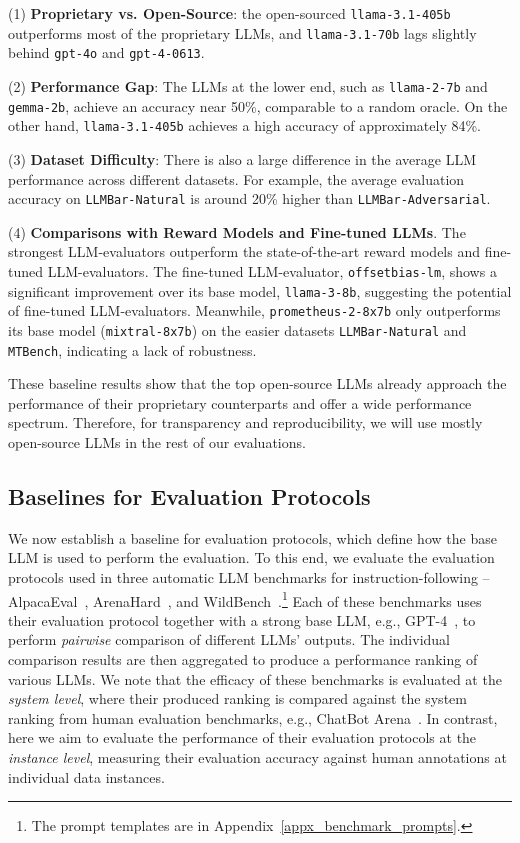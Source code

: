 \documentclass[11pt]{article}
\newcommand{\llmbarnatural}{\texttt{LLMBar-Natural}\xspace}
\newcommand{\adversarial}{\texttt{LLMBar-Adversarial}\xspace}
\newcommand{\mtbench}{\texttt{MTBench}\xspace}
\begin{document}
\noindent (1) \textbf{Proprietary vs. Open-Source}: the open-sourced \texttt{llama-3.1-405b} outperforms most of the proprietary LLMs, and \texttt{llama-3.1-70b}  lags slightly behind \texttt{gpt-4o} and \texttt{gpt-4-0613}.

% 

\noindent (2) \textbf{Performance Gap}:
The LLMs at the lower end, such as \texttt{llama-2-7b} and \texttt{gemma-2b}, achieve an accuracy near 50\%, comparable to a random oracle.
On the other hand, \texttt{llama-3.1-405b} achieves a high accuracy of approximately 84\%.

\noindent (3) \textbf{Dataset Difficulty}: 
There is also a large difference in the average LLM performance across different datasets.
For example, the average evaluation accuracy on \llmbarnatural is around 20\% higher than \adversarial.
% 

\noindent (4) \textbf{Comparisons with Reward Models and Fine-tuned LLMs}. 
The strongest LLM-evaluators outperform the state-of-the-art reward models and fine-tuned LLM-evaluators.
The fine-tuned LLM-evaluator, \texttt{offsetbias-lm}, shows a significant improvement over its base model, \texttt{llama-3-8b}, suggesting the potential of fine-tuned LLM-evaluators.
Meanwhile, \texttt{prometheus-2-8x7b} only outperforms its base model (\texttt{mixtral-8x7b}) on the easier datasets \llmbarnatural and \mtbench, indicating a lack of robustness.


These baseline results show that the top open-source LLMs already approach the performance of their proprietary counterparts and offer a wide performance spectrum. 
Therefore, for transparency and reproducibility, we will use mostly open-source LLMs in the rest of our evaluations.

\subsection{Baselines for Evaluation Protocols}
\label{baselines_protocols}




We now establish a baseline for evaluation protocols, which define how the base LLM is used to perform the evaluation.
To this end, we evaluate the evaluation protocols used in three automatic LLM benchmarks for instruction-following -- AlpacaEval~\cite{alpaca_eval}, ArenaHard~\cite{li2024crowdsourced}, and WildBench~\cite{lin2024wildbench}.\footnote{The prompt templates are in Appendix~\ref{appx_benchmark_prompts}.}
Each of these benchmarks uses their evaluation protocol together with a strong base LLM, e.g., GPT-4~\citep{achiam2023gpt}, to perform \textit{pairwise} comparison of different LLMs' outputs.
The individual comparison results are then aggregated to produce a performance ranking of various LLMs.
We note that the efficacy of these benchmarks is evaluated at the \textit{system level}, where their produced ranking is compared against the system ranking from human evaluation benchmarks, e.g., ChatBot Arena~\cite{chiang2024chatbot}.
In contrast, here we aim to evaluate the performance of their evaluation protocols at the \textit{instance level}, measuring their evaluation accuracy against human annotations at individual data instances. 
\end{document}
